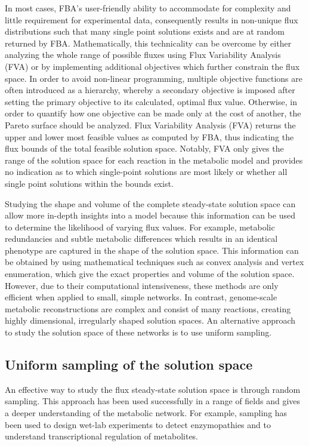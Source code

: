 \documentclass[10pt,letterpaper]{article}
\begin{document}
In most cases, FBA's user-friendly ability to accommodate for complexity and little requirement for experimental data, consequently results in non-unique flux distributions \cite{antoniewicz} such that many single point solutions exists and are at random returned by FBA. Mathematically, this technicality can be overcome by either analyzing the whole range of possible fluxes using Flux Variability Analysis (FVA) or by implementing additional objectives which further constrain the flux space. In order to avoid non-linear programming, multiple objective functions are often introduced as a hierarchy, whereby a secondary objective is imposed after setting the primary objective to its calculated, optimal flux value. Otherwise, in order to quantify how one objective can be made only at the cost of another, the Pareto surface should be analyzed\cite{schuetz}. Flux Variability Analysis (FVA) returns the upper and lower most feasible values as computed by FBA, thus indicating the flux bounds of the total feasible solution space. Notably, FVA only gives the range of the solution space for each reaction in the metabolic model and provides no indication as to which single-point solutions are most likely or whether all single point solutions within the bounds exist. 

Studying the shape and volume of the complete steady-state solution space can allow more in-depth insights into a model because this information can be used to determine the likelihood of varying flux values. For example, metabolic redundancies and subtle metabolic differences which results in an identical phenotype are captured in the shape of the solution space. This information can be obtained by using mathematical techniques such as convex analysis and vertex enumeration, which give the exact properties and volume of the solution space\cite{Schellenberger}. However, due to their computational intensiveness, these methods are only efficient when applied to small, simple networks\cite{Wiback}. In contrast, genome-scale metabolic reconstructions are complex and consist of many reactions, creating highly dimensional, irregularly shaped solution spaces. An alternative approach to study the solution space of these networks is to use uniform sampling\cite{Schellenberger}.

\subsection*{Uniform sampling of the solution space}
An effective way to study the flux steady-state solution space is through random sampling. This approach has been used successfully in a range of fields and gives a deeper understanding of the metabolic network. For example, sampling has been used to design wet-lab experiments to detect enzymopathies\cite{Price} and to understand transcriptional regulation of metabolites\cite{Bordel}.
\end{document}
